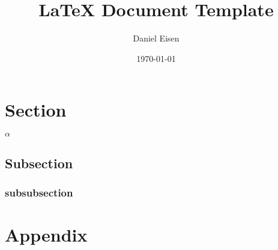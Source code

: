 \documentclass[11pt]{article}
\title{LaTeX Document Template}
\author{Daniel Eisen}
\date{\today}
\begin{document}
	\maketitle
	\tableofcontents

\section{Section}
$\alpha$
\subsection{Subsection}
\subsubsection{subsubsection}

\newpage
\section*{Appendix}
\end{document}
